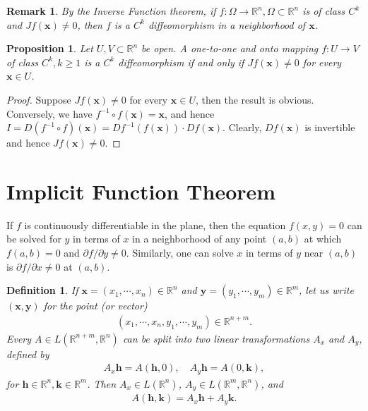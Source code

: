 \documentclass[10pt]{book}
\newtheorem{definition}{Definition}[chapter]
\newtheorem{proposition}{Proposition}[chapter]
\newtheorem{remark}{Remark}[chapter]
\theoremstyle{definition}
\numberwithin{equation}{chapter}
\begin{document}
\begin{remark}
By the Inverse Function theorem, if $f: \Omega \to \mathbb{R}^n, \Omega \subset \mathbb{R}^n$ is of class $C^k$ and $Jf(\mathbf{x}) \neq 0$, then $f$ is a $C^k$ diffeomorphism in a neighborhood of $\mathbf{x}$.
\end{remark}

\medskip

\begin{proposition}\label{prop_75}
Let $U,V \subset \mathbb{R}^n$ be open. A one-to-one and onto mapping $f: U \to V$ of class $C^k, k \geq 1$ is a $C^k$ diffeomorphism if and only if $Jf(\mathbf{x}) \neq 0$ for every $\mathbf{x} \in U$.
\end{proposition}
\begin{proof}
Suppose $Jf(\mathbf{x}) \neq 0$ for every $\mathbf{x} \in U$, then the result is obvious. Conversely, we have $f^{-1} \circ f(\mathbf{x}) = \mathbf{x}$, and hence $I = D(f^{-1} \circ f)(\mathbf{x}) = Df^{-1}(f(\mathbf{x})) \cdot Df(\mathbf{x})$. Clearly, $Df(\mathbf{x})$ is invertible and hence $Jf(\mathbf{x}) \neq 0$.
\end{proof}

\medskip




\section{Implicit Function Theorem}

If $f$ is continuously differentiable in the plane, then the equation $f(x,y) = 0$ can be solved for $y$ in terms of $x$ in a neighborhood of any point $(a,b)$ at which $f(a,b) = 0$ and $\partial f/\partial y \neq 0$. Similarly, one can solve $x$ in terms of $y$ near $(a,b)$ is $\partial f/\partial x \neq 0$ at $(a,b)$.

\medskip

\begin{definition}
If $\mathbf{x} = (x_1,\cdots,x_n) \in \mathbb{R}^n$ and $\mathbf{y} = (y_1,\cdots,y_m) \in \mathbb{R}^m$, let us write $(\mathbf{x},\mathbf{y})$ for the point (or vector)
\begin{align*}
    (x_1,\cdots,x_n, y_1,\cdots,y_m) \in \mathbb{R}^{n+m}.
\end{align*}
Every $A \in L(\mathbb{R}^{n+m}, \mathbb{R}^n)$ can be split into two linear transformations $A_x$ and $A_y$, defined by
\begin{align*}
    A_x \mathbf{h} = A(\mathbf{h},0), \quad A_y \mathbf{h} = A(0,\mathbf{k}),
\end{align*}
for $\mathbf{h} \in \mathbb{R}^n, \mathbf{k} \in \mathbb{R}^m$. Then $A_x \in L(\mathbb{R}^n)$, $A_y \in L(\mathbb{R}^m,\mathbb{R}^n)$, and
\begin{align}\label{def_714_equ1}
    A(\mathbf{h},\mathbf{k}) = A_x \mathbf{h} + A_y \mathbf{k}.
\end{align}
\end{definition}
\end{document}
